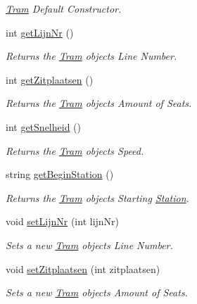 \begin{DoxyCompactItemize}
\begin{DoxyCompactList}\small\item\em \hyperlink{classTram}{Tram} Default Constructor. \end{DoxyCompactList}\item 
int \hyperlink{classTram_ab5a70cf696779f9dff401244e203f6c8}{get\+Lijn\+Nr} ()
\begin{DoxyCompactList}\small\item\em Returns the \hyperlink{classTram}{Tram} object\textquotesingle{}s Line Number. \end{DoxyCompactList}\item 
int \hyperlink{classTram_a018207b3cd1f01821b5f64e4f4f394a5}{get\+Zitplaatsen} ()
\begin{DoxyCompactList}\small\item\em Returns the \hyperlink{classTram}{Tram} object\textquotesingle{}s Amount of Seats. \end{DoxyCompactList}\item 
int \hyperlink{classTram_afcd79d44b9bc18fb1e7302daa40f56f5}{get\+Snelheid} ()
\begin{DoxyCompactList}\small\item\em Returns the \hyperlink{classTram}{Tram} object\textquotesingle{}s Speed. \end{DoxyCompactList}\item 
string \hyperlink{classTram_a0d61611abd4dc61f3fbad6b4b7bc6403}{get\+Begin\+Station} ()
\begin{DoxyCompactList}\small\item\em Returns the \hyperlink{classTram}{Tram} object\textquotesingle{}s Starting \hyperlink{classStation}{Station}. \end{DoxyCompactList}\item 
void \hyperlink{classTram_ac877b48ea6699c11ae580d8c71e140ac}{set\+Lijn\+Nr} (int lijn\+Nr)
\begin{DoxyCompactList}\small\item\em Sets a new \hyperlink{classTram}{Tram} object\textquotesingle{}s Line Number. \end{DoxyCompactList}\item 
void \hyperlink{classTram_a9071e3ddf218c290ae5d7ef3365097eb}{set\+Zitplaatsen} (int zitplaatsen)
\begin{DoxyCompactList}\small\item\em Sets a new \hyperlink{classTram}{Tram} object\textquotesingle{}s Amount of Seats. \end{DoxyCompactList}\item 

\end{DoxyCompactItemize}
